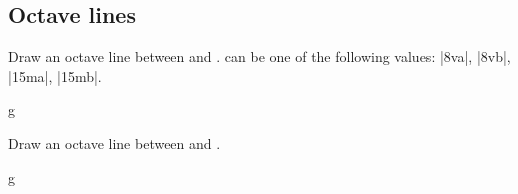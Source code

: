 \subsection{Octave lines}\label{sec:line:octave}
\begin{command}{\tmoctave{}}
  Draw an octave line between  and .  can 
  be one of the following values: |8va|, |8vb|, |15ma|, |15mb|.
\end{command}
\begin{codeexample}[]
\begin{tmline}
\begin{tmstaff}{g}{}
    
    
    
\end{tmstaff}
\end{tmline}
\end{codeexample}
\begin{command}{\tmoctaveline{}}
  Draw an octave line between  and .
\end{command}
\begin{codeexample}[]
\begin{tmline}
\begin{tmstaff}{g}{}
\end{tmstaff}
\end{tmline}
\end{codeexample}
